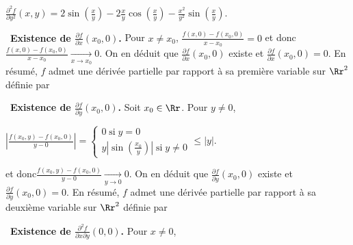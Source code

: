 {\begin{enumerate}
{\begin{center}
$\frac{\partial^2f}{\partial y^2}(x,y)=2\sin\left(\frac{x}{y}\right)-2\frac{x}{y}\cos\left(\frac{x}{y}\right)-\frac{x^2}{y^2}\sin\left(\frac{x}{y}\right)$.
\end{center}
\textbullet~\textbf{Existence de $\frac{\partial f}{\partial x}(x_0,0)$.} Pour $x\neq x_0$,  $\frac{f(x,0)-f(x_0,0)}{x-x_0}=0$ et donc$\frac{f(x,0)-f(x_0,0)}{x-x_0}\underset{x\rightarrow x_0}{\rightarrow}0$. On en déduit que $\frac{\partial f}{\partial x}(x_0,0)$ existe et $\frac{\partial f}{\partial x}(x_0,0)=0$. En résumé, $f$ admet une dérivée partielle par rapport à sa première variable sur $\Rr^2$ définie par

\begin{center}
\end{center}
\textbullet~\textbf{Existence de $\frac{\partial f}{\partial y}(x_0,0)$.} Soit $x_0\in\Rr$. Pour $y\neq0$,  

\begin{center}
$\left|\frac{f(x_0,y)-f(x_0,0)}{y-0}\right|=\left\{
\begin{array}{l}
0\;\text{si}\;y=0\\
y\left|\sin\left(\frac{x_0}{y}\right)\right|\;\text{si}\;y\neq0
\end{array}
\right.\leqslant|y|.
$
\end{center} 

et donc$\frac{f(x_0,y)-f(x_0,0)}{y-0}\underset{y\rightarrow0}{\rightarrow}0$. On en déduit que $\frac{\partial f}{\partial y}(x_0,0)$ existe et $\frac{\partial f}{\partial y}(x_0,0)=0$. En résumé, $f$ admet une dérivée partielle par rapport à sa deuxième variable sur $\Rr^2$ définie par

\begin{center}
\end{center}
\textbullet~\textbf{Existence de $\frac{\partial^2f}{\partial x\partial y}(0,0)$.} Pour $x\neq0$,

}
\end{enumerate}}
